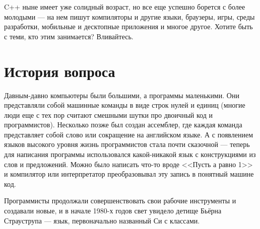 \documentclass{article}
\begin{document}
C++ ныне имеет уже солидный возраст, но все еще успешно борется с более молодыми --- на нем пишут компиляторы и другие языки, браузеры, игры, среды разработки, мобильные и десктопные приложения и многое другое. Хотите быть с теми, кто этим занимается? Вливайтесь.

\section{История вопроса}

Давным-давно компьютеры были большими, а программы маленькими. Они представляли собой машинные команды в виде строк нулей и единиц (многие люди еще с тех пор считают смешными шутки про двоичный код и программистов). Несколько позже был создан ассемблер, где каждая команда представляет собой слово или сокращение на английском языке. А с появлением языков высокого уровня жизнь программистов стала почти сказочной --- теперь для написания программы использовался какой-никакой язык с конструкциями из слов и предложений. Можно было написать что-то вроде <<Пусть а равно 1>> и компилятор или интерпретатор преобразовывал эту запись в понятный машине код.


Программисты продолжали совершенствовать свои рабочие инструменты и создавали новые, и в начале 1980-х годов свет увидело детище Бьёрна Страуструпа --- язык, первоначально названный Си с классами. 
\end{document}
